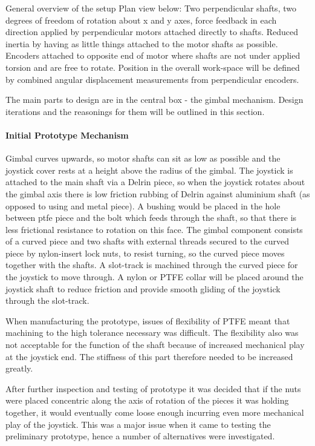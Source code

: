 General overview of the setup Plan view below: Two perpendicular shafts, two degrees of freedom of rotation about x and y axes, force feedback in each direction applied by perpendicular motors attached directly to shafts. Reduced inertia by having as little things attached to the motor shafts as possible. Encoders attached to opposite end of motor where shafts are not under applied torsion and are free to rotate. Position in the overall work-space will be defined by combined angular displacement measurements from perpendicular encoders.

The main parts to design are in the central box - the gimbal mechanism. Design iterations and the reasonings for them will be outlined in this section.


\paragraph{Initial Prototype Mechanism} %
\label{par:initial_prototype_mechanism}

Gimbal curves upwards, so motor shafts can sit as low as possible and the joystick cover rests at a height above the radius of the gimbal. The joystick is attached to the main shaft via a Delrin piece, so when the joystick rotates about the gimbal axis there is low friction rubbing of Delrin against aluminium shaft (as opposed to using and metal piece). A bushing would be placed in the hole between ptfe piece and the bolt which feeds through the shaft, so that there is less frictional resistance to rotation on this face. The gimbal component consists of a curved piece and two shafts with external threads secured to the curved piece by nylon-insert lock nuts, to resist turning, so the curved piece moves together with the shafts. A slot-track is machined through the curved piece for the joystick to move through. A nylon or PTFE collar will be placed around the joystick shaft to reduce friction and provide smooth gliding of the joystick through the slot-track.

When manufacturing the prototype, issues of flexibility of PTFE meant that machining to the high tolerance necessary was difficult. The flexibility also was not acceptable for the function of the shaft because of increased mechanical play at the joystick end. The stiffness of this part therefore needed to be increased greatly.

After further inspection and testing of prototype it was decided that if the nuts were placed concentric along the axis of rotation of the pieces it was holding together, it would eventually come loose enough incurring even more mechanical play of the joystick. This was a major issue when it came to testing the preliminary prototype, hence a number of alternatives were investigated.

